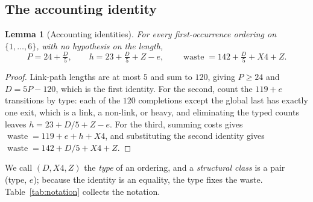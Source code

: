 \documentclass[10pt]{article}
\newtheorem{lemma}[theorem]{Lemma}
\theoremstyle{remark}
\theoremstyle{plain}
\newcommand{\waste}{\operatorname{waste}}
\begin{document}
\subsection{The accounting identity}

\begin{lemma}[Accounting identities]\label{lem:identities}
For every first-occurrence ordering on $\{1,\dots,6\}$, with no
hypothesis on the length,
\[
P = 24+\tfrac{D}{5},\qquad
h = 23+\tfrac{D}{5}+Z-e,\qquad
\waste = 142+\tfrac{D}{5}+X4+Z .
\]
\end{lemma}

\begin{proof}
Link-path lengths are at most $5$ and sum to $120$, giving
$P\ge 24$ and $D=5P-120$, which is the first identity.  For the second,
count the $119+e$ transitions by type: each of the $120$ completions
except the global last has exactly one exit, which is a link, a
non-link, or heavy, and eliminating the typed counts leaves
$h=23+D/5+Z-e$.  For the third, summing costs gives
$\waste=119+e+h+X4$, and substituting the second identity gives
$\waste=142+D/5+X4+Z$.
\end{proof}

We call $(D,X4,Z)$ the \emph{type} of an ordering, and a
\emph{structural class} is a pair (type, $e$); because the identity
is an equality, the type fixes the waste.  Table~\ref{tab:notation}
collects the notation.
\end{document}
